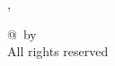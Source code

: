 \begin{flushright}
        \vspace{1 cm}
        \underline{\hspace{8cm}} \\ 
        \MakeUppercase{\authorName} \\
        \schoolPlace, \thesisDate
\end{flushright}

\null
\vfill

\begin{center}
	{@}\thesisYear\ by \authorName \\
	All rights reserved
\end{center}
